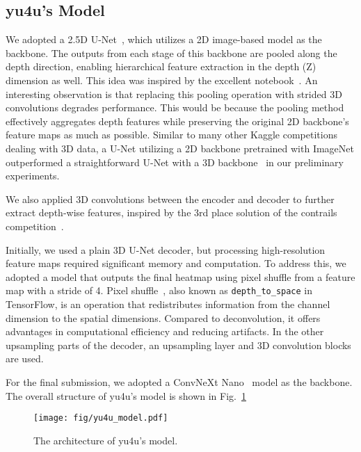 \subsection{yu4u's Model}
We adopted a 2.5D U-Net~\cite{Kumar2024}, which utilizes a 2D image-based model as the backbone.
The outputs from each stage of this backbone are pooled along the depth direction, enabling hierarchical feature extraction in the depth (Z) dimension as well.
This idea was inspired by the excellent notebook~\cite{hengck232025}.
An interesting observation is that replacing this pooling operation with strided 3D convolutions degrades performance.
This would be because the pooling method effectively aggregates depth features while preserving the original 2D backbone’s feature maps as much as possible.
Similar to many other Kaggle competitions dealing with 3D data, a U-Net utilizing a 2D backbone pretrained with ImageNet outperformed a straightforward U-Net with a 3D backbone~\cite{Cicek2016} in our preliminary experiments.

We also applied 3D convolutions between the encoder and decoder to further extract depth-wise features, inspired by the 3rd place solution of the contrails competition~\cite{knshnb2025}.


Initially, we used a plain 3D U-Net decoder, but processing high-resolution feature maps required significant memory and computation. To address this, we adopted a model that outputs the final heatmap using pixel shuffle from a feature map with a stride of 4. Pixel shuffle~\cite{Shi2016}, also known as \texttt{depth\_to\_space} in TensorFlow, is an operation that redistributes information from the channel dimension to the spatial dimensions. Compared to deconvolution, it offers advantages in computational efficiency and reducing artifacts.
In the other upsampling parts of the decoder, an upsampling layer and 3D convolution blocks are used.


For the final submission, we adopted a ConvNeXt Nano~\cite{Sanghyun2023} model as the backbone.
The overall structure of yu4u's model is shown in Fig.~\ref{fig:yu4u_model}


\begin{figure}[tb]
    \centering
    \texttt{[image: fig/yu4u\_model.pdf]}
    \caption{The architecture of yu4u's model.}
    \label{fig:yu4u_model}
\end{figure}




